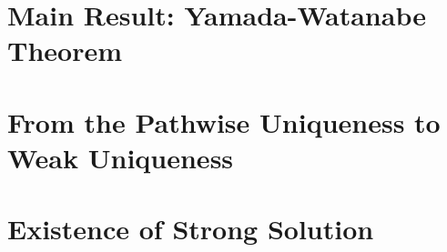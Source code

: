 \documentclass[8pt,onesided]{article}
\begin{document}
\section{Main Result: Yamada-Watanabe Theorem}

\section{From the Pathwise Uniqueness to Weak Uniqueness}

\section{Existence of Strong Solution}





\end{document}
